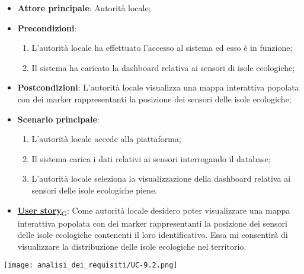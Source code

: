 \begin{itemize}
	\item \textbf{Attore principale}: Autorità locale;
	\item \textbf{Precondizioni}:
	      \begin{enumerate}
		      \item L'autorità locale ha effettuato l'accesso al sistema ed esso è in funzione;
		      \item Il sistema ha caricato la dashboard relativa ai sensori di isole ecologiche;
	      \end{enumerate}
	\item \textbf{Postcondizioni}: L'autorità locale visualizza una mappa interattiva popolata con dei marker rappresentanti la posizione dei sensori delle isole ecologiche;
	\item \textbf{Scenario principale}:
	      \begin{enumerate}
		      \item L'autorità locale accede alla piattaforma;
		      \item Il sistema carica i dati relativi ai sensori interrogando il database;
		      \item L'autorità locale seleziona la visualizzazione della dashboard relativa ai sensori delle isole ecologiche piene.
	      \end{enumerate}
	\item \href{https://7last.github.io/docs/rtb/documentazione-interna/glossario\#user-story}{\textbf{User story}\textsubscript{G}}:
	      Come autorità locale desidero poter visualizzare una mappa interattiva popolata con dei marker rappresentanti la posizione dei sensori delle isole ecologiche
	      contenenti il loro identificativo. Essa mi consentirà di visualizzare la distribuzione delle isole ecologiche nel territorio.
\end{itemize}
\begin{center}
	\texttt{[image: analisi\_dei\_requisiti/UC-9.2.png]}
\end{center}

